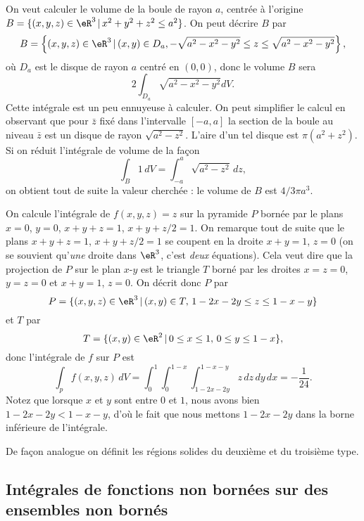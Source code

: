 \begin{example}
	On veut calculer le volume de la boule de rayon \( a\), centrée à l'origine \( B=\{(x,y,z)\in\eR^3\,\vert\, x^2+y^2+z^2\leq a^2 \}\). On peut décrire \( B\) par
	\[
		B=\left\{(x,y,z)\in\eR^3\,\vert\, (x,y)\in D_a, -\sqrt{a^2-x^2-y^2}\leq z\leq \sqrt{a^2-x^2-y^2}  \right\},
	\]
	où \( D_a\) est le disque de rayon \( a\) centré en \( (0,0)\), donc le volume \( B\) sera
	\[
		2 \int_{D_a}\sqrt{a^2-x^2-y^2} dV.
	\]
	Cette intégrale est un peu ennuyeuse à calculer. On peut simplifier le calcul en observant que pour \( \bar z\) fixé dans l'intervalle \( [-a,a]\) la section de la boule au niveau \( \bar z\) est un disque de rayon \( \sqrt{a^2-z^2}\). L'aire d'un tel disque est  \( \pi (a^2+z^2)\). Si on réduit l'intégrale de volume de la façon
	\[
		\int_{B} 1\, dV=\int_{-a}^{a}  \sqrt{a^2-z^2}\, dz,
	\]
	on obtient tout de suite la valeur cherchée : le volume de \( B\) est \( 4/3 \pi a^3\).
\end{example}
\begin{example}
	On calcule l'intégrale de \( f(x,y,z)=z\) sur la pyramide \( P\) bornée par le plans \( x=0\), \( y=0\), \( x+y+z=1\), \( x+y+z/2=1\). On remarque tout de suite que le plans \( x+y+z=1\), \( x+y+z/2=1\) se coupent en la droite \( x+y=1\), \( z=0\) (on se souvient qu'\emph{une} droite dans \( \eR^3\), c'est \emph{deux} équations). Cela veut dire que la projection de \( P\) sur le plan \( x\)-\( y\) est le  triangle \( T\) borné par les droites \( x=z=0\), \( y=z=0\) et \( x+y=1\), \( z=0\).
	On  décrit donc \( P\) par
	\[
		P=\{(x,y,z)\in\eR^3\,\vert\, (x,y)\in T, \, 1-2x-2y\leq z\leq 1-x-y\}
	\]
	et \( T\) par
	\[
		T=\{(x,y)\in\eR^2\,\vert\, 0\leq x\leq 1,\,  0\leq y\leq 1-x\},
	\]
	donc l'intégrale de \( f\) sur \( P\) est
	\[
		\int_pf(x,y,z)\, dV= \int_{0}^{1}\int_{0}^{1-x}\int_{1-2x-2y}^{1-x-y}z \,dz\,dy\,dx=-\frac{1}{ 24 }.
	\]
	Notez que lorsque \( x\) et \( y\) sont entre \( 0\) et \( 1\), nous avons bien \( 1-2x-2y<1-x-y\), d'où le fait que nous mettons \( 1-2x-2y\) dans la borne inférieure de l'intégrale.
\end{example}

De façon analogue on définit les régions solides du deuxième et du troisième type.

\subsection[Fonctions et ensembles non bornés]{Intégrales de fonctions non bornées sur des ensembles non bornés}

